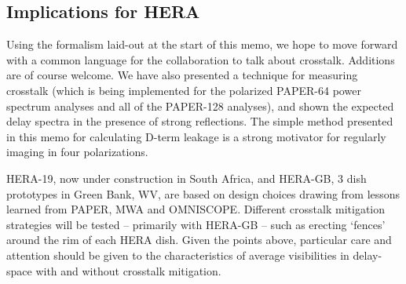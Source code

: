 \documentclass[10pt,a4paper,notitlepage]{article}
\begin{document}
\subsection{Implications for HERA}

Using the formalism laid-out at the start of this memo, we hope to move forward with a common language for the collaboration to talk about crosstalk. Additions are of course welcome. We have also presented a technique for measuring crosstalk (which is being implemented for the polarized PAPER-64 power spectrum analyses and all of the PAPER-128 analyses), and shown the expected delay spectra in the presence of strong reflections. The simple method presented in this memo for calculating D-term leakage is a strong motivator for regularly imaging in four polarizations.

HERA-19, now under construction in South Africa, and HERA-GB, 3 dish prototypes in Green Bank, WV, are based on design choices drawing from lessons learned from PAPER, MWA and OMNISCOPE. Different crosstalk mitigation strategies will be tested -- primarily with HERA-GB -- such as erecting `fences' around the rim of each HERA dish.
Given the points above, particular care and attention should be given to the characteristics of average visibilities in delay-space with and without crosstalk mitigation.




\end{document}
